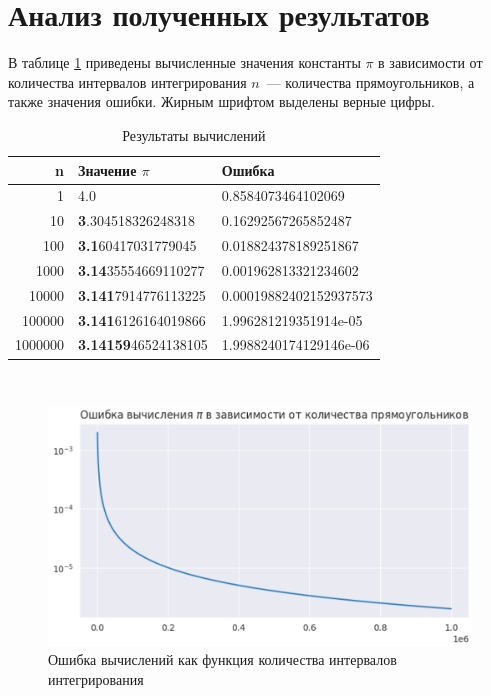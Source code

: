 \documentclass[a4paper,12pt]{article}
\begin{document}
\section{Анализ полученных результатов}

В таблице \ref{table:results} приведены вычисленные значения константы $\pi$ в зависимости от количества интервалов интегрирования $n$~--- количества прямоугольников, а также значения ошибки. Жирным шрифтом выделены верные цифры.

\begin{table}[h!]
    \caption{Результаты вычислений\label{table:results}}
    \begin{center}
    \begin{tabular}{||r l l||} 
     \hline
     n & Значение $\pi$ & Ошибка \\ [0.5ex] 
     \hline\hline
     1 & 4.0 & 0.8584073464102069 \\ 
     \hline
     10 & \textbf{3}.304518326248318 & 0.16292567265852487 \\
     \hline
     100 & \textbf{3.1}60417031779045 & 0.018824378189251867 \\
     \hline
     1000 & \textbf{3.14}35554669110277 & 0.001962813321234602 \\ 
     \hline
     10000 & \textbf{3.141}7914776113225 & 0.00019882402152937573 \\ 
     \hline
     100000 & \textbf{3.141}6126164019866 & 1.996281219351914e-05 \\ 
     \hline
     1000000 & \textbf{3.14159}46524138105 & 1.9988240174129146e-06 \\ 
     \hline               
    \end{tabular}
    \end{center}
\end{table}


\begin{figure}[h]\
    \begin{center}
    \includegraphics[width=15cm]{error.png}    
    \caption{Ошибка вычислений как функция количества интервалов интегрирования}
    \label{fig:error}
    \end{center}
\end{figure}
\end{document}
